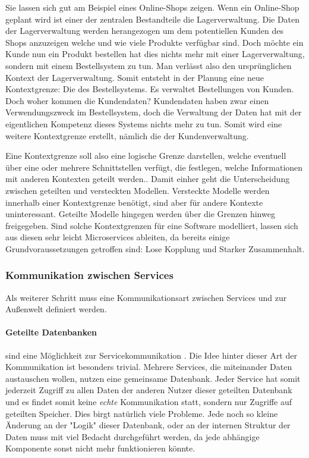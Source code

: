 \documentclass[12pt,a4paper,bibliography=totocnumbered,listof=totocnumbered]{scrartcl}
\begin{document}
Sie lassen sich gut am Beispiel eines Online-Shops zeigen. Wenn ein Online-Shop geplant wird ist einer der zentralen Bestandteile die Lagerverwaltung. Die Daten der Lagerverwaltung werden herangezogen um dem potentiellen Kunden des Shops anzuzeigen welche und wie viele Produkte verfügbar sind. Doch möchte ein Kunde nun ein Produkt bestellen hat dies nichts mehr mit einer Lagerverwaltung, sondern mit einem Bestellsystem zu tun. Man verlässt also den ursprünglichen Kontext der Lagerverwaltung. Somit entsteht in der Planung eine neue Kontextgrenze: Die des Bestellsystems. Es verwaltet Bestellungen von Kunden. Doch woher kommen die Kundendaten? Kundendaten haben zwar einen Verwendungszweck im Bestellsystem, doch die Verwaltung der Daten hat mit der eigentlichen Kompetenz dieses Systems nichts mehr zu tun. Somit wird eine weitere Kontextgrenze erstellt, nämlich die der Kundenverwaltung.

Eine Kontextgrenze soll also eine logische Grenze darstellen, welche eventuell über eine oder mehrere Schnittstellen verfügt, die festlegen, welche Informationen mit anderen Kontexten geteilt werden.\cite[S.65]{buildingms}. Damit einher geht die Unterscheidung zwischen geteilten und versteckten Modellen. Versteckte Modelle werden innerhalb einer Kontextgrenze benötigt, sind aber für andere Kontexte uninteressant. Geteilte Modelle hingegen werden über die Grenzen hinweg freigegeben. Sind solche Kontextgrenzen für eine Software modelliert, lassen sich aus diesen sehr leicht Microservices ableiten, da bereits einige Grundvoraussetzungen getroffen sind: Lose Kopplung und Starker Zusammenhalt.\cite[S.68]{buildingms}


\subsubsection{Kommunikation zwischen Services}

Als weiterer Schritt muss eine Kommunikationsart zwischen Services und zur Außenwelt definiert werden.

\paragraph{Geteilte Datenbanken} sind eine Möglichkeit zur Servicekommunikation \cite[S.85]{buildingms}. Die Idee hinter dieser Art der Kommunikation ist besonders trivial. Mehrere Services, die miteinander Daten austauschen wollen, nutzen eine gemeinsame Datenbank. Jeder Service hat somit jederzeit Zugriff zu allen Daten der anderen Nutzer dieser geteilten Datenbank und es findet somit keine \textit{echte} Kommunikation statt, sondern nur Zugriffe auf geteilten Speicher.\cite{shareddb}
Dies birgt natürlich viele Probleme. Jede noch so kleine Änderung an der "Logik" dieser Datenbank, oder an der internen Struktur der Daten muss mit viel Bedacht durchgeführt werden, da jede abhängige Komponente sonst nicht mehr funktionieren könnte.
\end{document}

